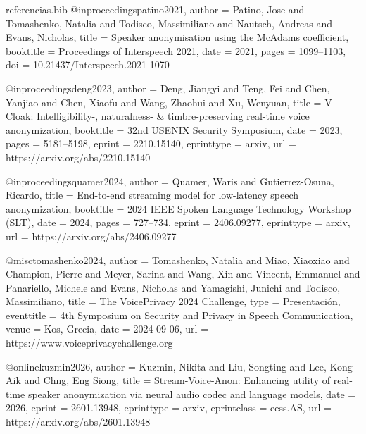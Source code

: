 \begin{filecontents}{referencias.bib}
@inproceedings{patino2021,
  author    = {Patino, Jose and Tomashenko, Natalia and Todisco, Massimiliano and Nautsch, Andreas and Evans, Nicholas},
  title     = {Speaker anonymisation using the {McAdams} coefficient},
  booktitle = {Proceedings of Interspeech 2021},
  date      = {2021},
  pages     = {1099--1103},
  doi       = {10.21437/Interspeech.2021-1070}
}

@inproceedings{deng2023,
  author     = {Deng, Jiangyi and Teng, Fei and Chen, Yanjiao and Chen, Xiaofu and Wang, Zhaohui and Xu, Wenyuan},
  title      = {{V-Cloak}: Intelligibility-, naturalness- \& timbre-preserving real-time voice anonymization},
  booktitle  = {32nd {USENIX} Security Symposium},
  date       = {2023},
  pages      = {5181--5198},
  eprint     = {2210.15140},
  eprinttype = {arxiv},
  url        = {https://arxiv.org/abs/2210.15140}
}

@inproceedings{quamer2024,
  author     = {Quamer, Waris and Gutierrez-Osuna, Ricardo},
  title      = {End-to-end streaming model for low-latency speech anonymization},
  booktitle  = {2024 {IEEE} Spoken Language Technology Workshop ({SLT})},
  date       = {2024},
  pages      = {727--734},
  eprint     = {2406.09277},
  eprinttype = {arxiv},
  url        = {https://arxiv.org/abs/2406.09277}
}

@misc{tomashenko2024,
  author     = {Tomashenko, Natalia and Miao, Xiaoxiao and Champion, Pierre and Meyer, Sarina and Wang, Xin and Vincent, Emmanuel and Panariello, Michele and Evans, Nicholas and Yamagishi, Junichi and Todisco, Massimiliano},
  title      = {The {VoicePrivacy} 2024 Challenge},
  type       = {Presentación},
  eventtitle = {4th Symposium on Security and Privacy in Speech Communication},
  venue      = {Kos, Grecia},
  date       = {2024-09-06},
  url        = {https://www.voiceprivacychallenge.org}
}

@online{kuzmin2026,
  author      = {Kuzmin, Nikita and Liu, Songting and Lee, Kong Aik and Chng, Eng Siong},
  title       = {{Stream-Voice-Anon}: Enhancing utility of real-time speaker anonymization via neural audio codec and language models},
  date        = {2026},
  eprint      = {2601.13948},
  eprinttype  = {arxiv},
  eprintclass = {eess.AS},
  url         = {https://arxiv.org/abs/2601.13948}
}


\end{filecontents}
